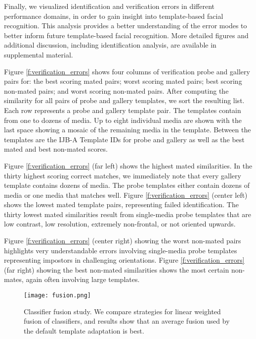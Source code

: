 \documentclass[10pt,twocolumn,letterpaper]{article}
\theoremstyle{definition}		\newtheorem{defn}[thm]{Definition}
\newcommand{\figwidth}{6.85in}
\newcommand{\ARXIV}{}
\begin{document}
Finally, we visualized identification and verification errors in different performance domains, in order to gain insight into template-based facial recognition.  This analysis provides a better understanding of the error modes to better inform future template-based facial recognition.  More detailed figures and additional discussion, including identification analysis, are available in supplemental material.




 
Figure \ref{f:verification_errors} shows four columns of verification probe and gallery pairs for: the best scoring mated pairs; worst scoring mated pairs; best scoring non-mated pairs; and worst scoring non-mated pairs.  After computing the similarity for all pairs of probe and gallery templates, we sort the resulting list.  Each row represents a probe and gallery template pair.  The templates contain from one to dozens of media.  Up to eight individual media are shown with the last space showing a mosaic of the remaining media in the template.  Between the templates are the IJB-A Template IDs for probe and gallery as well as the best mated and best non-mated scores.
 


Figure \ref{f:verification_errors} (far left) shows the highest mated similarities.  In the thirty highest scoring correct matches, we immediately note that every gallery template contains dozens of media. The probe templates either contain dozens of media or one media that matches well.  Figure \ref{f:verification_errors} (center left) shows the lowest mated template pairs, representing failed identification.  The thirty lowest mated similarities result from single-media probe templates that are low contrast, low resolution, extremely non-frontal, or not oriented upwards.
 
Figure \ref{f:verification_errors} (center right) showing the worst non-mated pairs highlights very understandable errors involving single-media probe templates representing impostors in challenging orientations.  Figure \ref{f:verification_errors} (far right) showing the best non-mated similarities shows the most certain non-mates, again often involving large templates.
 

\ifdefined\ARXIV
\begin{figure*}[!t]
\begin{centering}
\texttt{[image: fusion.png]} 
\caption{Classifier fusion study.  We compare strategies for linear weighted fusion of classifiers, and results show that an average fusion used by the default template adaptation is best.}  
\label{f:fusion}
\end{centering}
\end{figure*}
\end{document}
